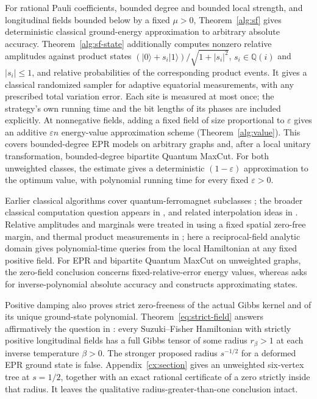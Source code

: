 \documentclass[reqno]{amsart}
\theoremstyle{definition}
\theoremstyle{remark}
\begin{document}
For rational Pauli coefficients, bounded degree and bounded local
strength, and longitudinal fields bounded below by a fixed $\mu>0$,
Theorem~\ref{alg:sf} gives deterministic classical ground-energy
approximation to arbitrary absolute accuracy.
Theorem~\ref{alg:sf-state} additionally computes nonzero relative
amplitudes against product states
$(|0\rangle+s_i|1\rangle)/\sqrt{1+|s_i|^2}$,
$s_i\in\mathbb Q(i)$ and $|s_i|\le1$,
and relative probabilities of the corresponding product events.
It gives a classical randomized sampler for adaptive equatorial
measurements, with any prescribed total variation error. Each site
is measured at most once; the strategy's own running time and
the bit lengths of its phases are included explicitly.
At nonnegative fields, adding a fixed field of size proportional
to $\varepsilon$ gives an additive $\varepsilon n$ energy-value
approximation scheme (Theorem~\ref{alg:value}).
This covers bounded-degree EPR models on arbitrary graphs and,
after a local unitary transformation, bounded-degree bipartite
Quantum MaxCut. For both unweighted classes, the estimate gives a deterministic
$(1-\varepsilon)$ approximation to the optimum value, with polynomial
running time for every fixed $\varepsilon>0$.

Earlier classical algorithms cover quantum-ferromagnet subclasses
\cite{BG17,HMS20}; the broader classical computation question appears
in \cite{BGLW26}, and related interpolation ideas in
\cite{WongTalk23,WongThesis26}.
Relative amplitudes and marginals were treated in
\cite[Section~4]{WBG26} using a fixed spatial zero-free margin,
and thermal product measurements in \cite[Theorem~15]{YYZ22}; here a
reciprocal-field analytic domain gives polynomial-time queries from
the local Hamiltonian at any fixed positive field.
For EPR and bipartite Quantum MaxCut on unweighted graphs, the zero-field conclusion
concerns fixed-relative-error energy values, whereas
\cite{MarwahaSud26} asks for inverse-polynomial absolute
accuracy and \cite{ALMPSS26} constructs approximating states.

Positive damping also proves strict zero-freeness of the actual Gibbs
kernel and of its unique ground-state polynomial.
Theorem~\ref{eq:strict-field} answers affirmatively the question in
\cite[Section~5.3]{WBG26}: every Suzuki--Fisher Hamiltonian with
strictly positive longitudinal fields has a full Gibbs tensor of some
radius $r_\beta>1$ at each inverse temperature $\beta>0$.
The stronger proposed radius $s^{-1/2}$ for a deformed EPR ground
state is false. Appendix~\ref{cx:section} gives an unweighted
six-vertex tree at $s=1/2$, together with an exact rational certificate
of a zero strictly inside that radius. It leaves the qualitative
radius-greater-than-one conclusion intact.
\end{document}
